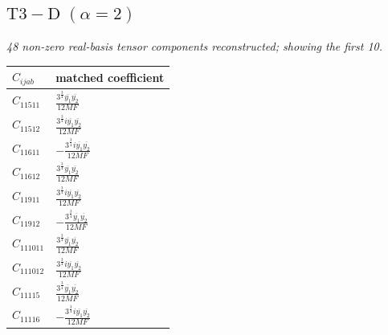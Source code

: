 \documentclass[9pt]{article}
\begin{document}
\subsection*{$ \mathrm{T3-D}\;(\alpha=2) $}
\textit{48 non-zero real-basis tensor components reconstructed; showing the first 10.}
\begin{longtable}{@{}ll@{}}
\toprule
$C_{ijab}$ & matched coefficient \\
\midrule
$C_{11511}$ & $ \frac{3^{\frac{3}{4}} \overline{y_{1}} \overline{y_{2}}}{12 MF} $ \\
$C_{11512}$ & $ \frac{3^{\frac{3}{4}} i \overline{y_{1}} \overline{y_{2}}}{12 MF} $ \\
$C_{11611}$ & $ - \frac{3^{\frac{3}{4}} i \overline{y_{1}} \overline{y_{2}}}{12 MF} $ \\
$C_{11612}$ & $ \frac{3^{\frac{3}{4}} \overline{y_{1}} \overline{y_{2}}}{12 MF} $ \\
$C_{11911}$ & $ \frac{3^{\frac{3}{4}} i \overline{y_{1}} \overline{y_{2}}}{12 MF} $ \\
$C_{11912}$ & $ - \frac{3^{\frac{3}{4}} \overline{y_{1}} \overline{y_{2}}}{12 MF} $ \\
$C_{111011}$ & $ \frac{3^{\frac{3}{4}} \overline{y_{1}} \overline{y_{2}}}{12 MF} $ \\
$C_{111012}$ & $ \frac{3^{\frac{3}{4}} i \overline{y_{1}} \overline{y_{2}}}{12 MF} $ \\
$C_{11115}$ & $ \frac{3^{\frac{3}{4}} \overline{y_{1}} \overline{y_{2}}}{12 MF} $ \\
$C_{11116}$ & $ - \frac{3^{\frac{3}{4}} i \overline{y_{1}} \overline{y_{2}}}{12 MF} $ \\
\bottomrule
\end{longtable}
\end{document}
